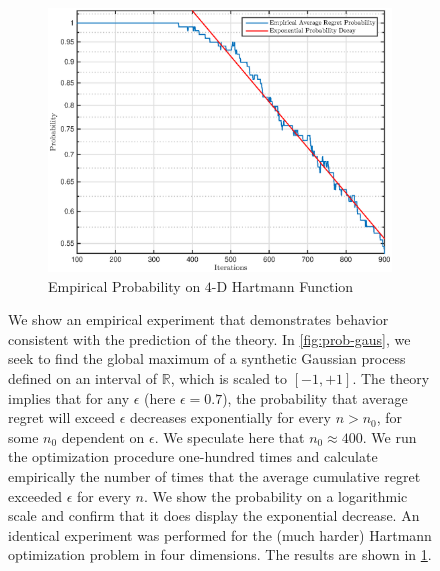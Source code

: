 \documentclass[]{article}
\newcommand{\brac}[1]{\left[{#1}\right]}
\newcommand{\R}{\mathbb{R}}
\newcommand{\1}{\mathbf{1}}
\newcommand{\0}{\mathbf{0}}
\begin{document}
\begin{figure}
    \begin{subfigure}[b]{0.45\textwidth}
		\includegraphics[width=\textwidth]{images/probability_3.eps}
	    \caption{Empirical Probability on $4$-D Hartmann Function}
		\label{fig:prob-hart}
	\end{subfigure}
	\caption{We show an empirical experiment that demonstrates behavior consistent with the prediction of the theory. In \ref{fig:prob-gaus}, we seek to find the global maximum of a synthetic Gaussian process defined on an interval of $\R$, which is scaled to $\brac{-1,+1}$. The theory implies that for any $\epsilon$ (here $\epsilon = 0.7$), the probability that average regret will exceed $\epsilon$ decreases exponentially for every $n>n_0$, for some $n_0$ dependent on $\epsilon$. We speculate here that $n_0\approx 400$. We run the optimization procedure one-hundred times and calculate empirically the number of times that the average cumulative regret exceeded $\epsilon$ for every $n$. We show the probability on a logarithmic scale and confirm that it does display the exponential decrease. An identical experiment was performed for the (much harder) Hartmann optimization problem in four dimensions. The results are shown in \ref{fig:prob-hart}.}
	\label{fig:prob}
\end{figure}
\end{document}
